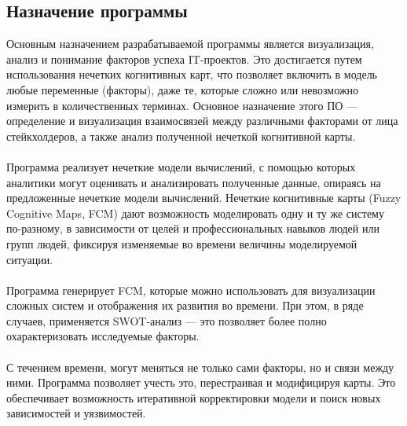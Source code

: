 \documentclass{article}
\begin{document}
    \subsection {Назначение программы}
    Основным назначением разрабатываемой программы является визуализация, анализ и понимание факторов успеха IT-проектов. Это достигается путем использования нечетких когнитивных карт, что позволяет включить в модель любые переменные (факторы), даже те, которые сложно или невозможно измерить в количественных терминах. Основное назначение этого ПО — определение и визуализация взаимосвязей между различными факторами от лица стейкхолдеров, а также анализ полученной нечеткой когнитивной карты.\\
    ~\\
    Программа реализует нечеткие модели вычислений, с помощью которых аналитики могут оценивать и анализировать полученные данные, опираясь на предложенные нечеткие модели вычислений. Нечеткие когнитивные карты (Fuzzy Cognitive Maps, FCM) дают возможность моделировать одну и ту же систему по-разному, в зависимости от целей и профессиональных навыков людей или групп людей, фиксируя изменяемые во времени величины моделируемой ситуации.\\
    ~\\
    Программа генерирует FCM, которые можно использовать для визуализации сложных систем и отображения их развития во времени. При этом, в ряде случаев, применяется SWOT-анализ — это позволяет более полно охарактеризовать исследуемые факторы.\\
    ~\\
    С течением времени, могут меняться не только сами факторы, но и связи между ними. Программа позволяет учесть это, перестраивая и модифицируя карты. Это обеспечивает возможность итеративной корректировки модели и поиск новых зависимостей и уязвимостей.\\
\end{document}
